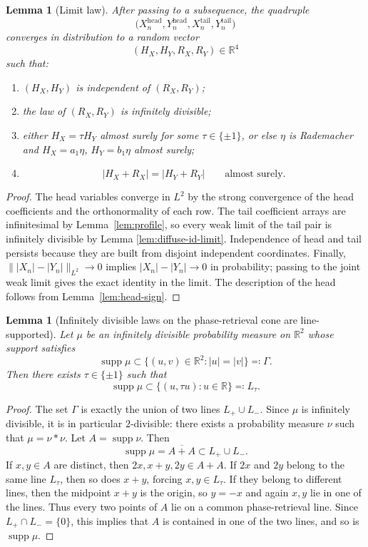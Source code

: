 \documentclass[11pt]{amsart}
\numberwithin{equation}{section}
\newtheorem{lemma}[theorem]{Lemma}
\theoremstyle{definition}
\theoremstyle{remark}
\newcommand{\R}{\mathbb R}
\newcommand{\supp}{\operatorname{supp}}
\newcommand{\abs}[1]{\lvert #1 \rvert}
\newcommand{\norm}[1]{\lVert #1 \rVert}
\begin{document}
\begin{lemma}[Limit law]\label{lem:limit-law}
After passing to a subsequence, the quadruple
\[
\bigl(X_n^{\mathrm{head}},Y_n^{\mathrm{head}},
X_n^{\mathrm{tail}},Y_n^{\mathrm{tail}}\bigr)
\]
converges in distribution to a random vector
\[
(H_X,H_Y,R_X,R_Y)\in\R^4
\]
such that:
\begin{enumerate}[label=\rm(\arabic*)]
\item $(H_X,H_Y)$ is independent of $(R_X,R_Y)$;
\item the law of $(R_X,R_Y)$ is infinitely divisible;
\item either $H_X=\tau H_Y$ almost surely for some $\tau\in\{\pm1\}$, or
else $\eta$ is Rademacher and
$H_X=a_1\eta$, $H_Y=b_1\eta$ almost surely;
\item
\[
\abs{H_X+R_X}=\abs{H_Y+R_Y}
\qquad\text{almost surely.}
\]
\end{enumerate}
\end{lemma}

\begin{proof}
The head variables converge in $L^2$ by the strong convergence of the head
coefficients and the orthonormality of each row.  The tail coefficient arrays
are infinitesimal by Lemma~\ref{lem:profile}, so every weak limit of the
tail pair is infinitely divisible by Lemma \ref{lem:diffuse-id-limit}.  Independence of head and tail persists
because they are built from disjoint independent coordinates.  Finally,
$\norm{\abs{X_n}-\abs{Y_n}}_{L^2}\to0$ implies
$\abs{X_n}-\abs{Y_n}\to0$ in probability; passing to the joint weak limit
gives the exact identity in the limit.  The description of the head follows
from Lemma~\ref{lem:head-sign}.
\end{proof}

\begin{lemma}[Infinitely divisible laws on the phase-retrieval cone are
line-supported]\label{lem:id-line}
Let $\mu$ be an infinitely divisible probability measure on $\R^2$ whose support satisfies
\[
\supp\mu\subset\{(u,v)\in\R^2:\abs{u}=\abs{v}\} \eqqcolon \Gamma.
\]
Then there exists $\tau\in\{\pm1\}$ such that
\[
\supp\mu\subset \{(u,\tau u):u\in\R\} \eqqcolon L_\tau.
\]
\end{lemma}

\begin{proof}
The set $\Gamma$ is exactly the union of two lines $L_+\cup L_-$.  Since $\mu$ is
infinitely divisible, it is in particular $2$-divisible: there exists a
probability measure $\nu$ such that $\mu=\nu*\nu$.  Let $A=\supp\nu$.  Then
\[
\supp\mu=\overline{A+A}\subset L_+\cup L_-.
\]
If $x,y\in A$ are distinct, then $2x,x+y,2y\in A+A$.  If $2x$ and $2y$ belong
to the same line $L_\tau$, then so does $x+y$, forcing $x,y\in L_\tau$.  If
they belong to different lines, then the midpoint $x+y$ is the origin, so
$y=-x$ and again $x,y$ lie in one of the lines.  Thus every two points of $A$
lie on a common phase-retrieval line.  Since $L_+\cap L_-=\{0\}$, this implies
that $A$ is contained in one of the two lines, and so is $\supp\mu$.
\end{proof}
\end{document}
